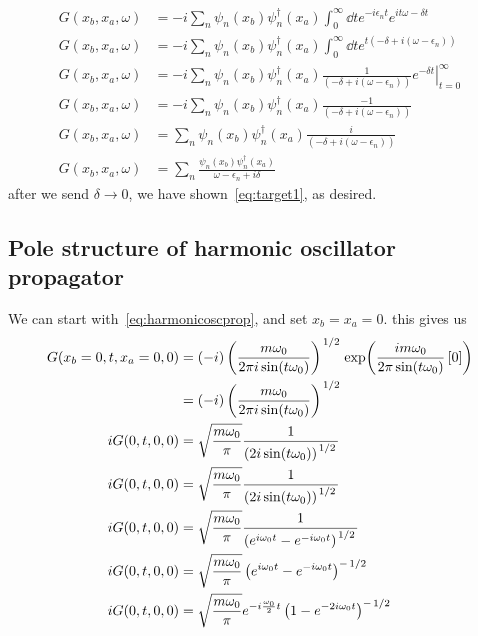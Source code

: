 \documentclass{article}
\begin{document}
	\triv
	\begin{align}
		G(x_b, x_a, \omega) &= -i \sum_{n} \psi_n(x_b) \psi_n^\dagger(x_a)  \int_0^\infty \dd{t} e^{-i \epsilon_{n} t } e^{i t \omega - \delta t} \\
		G(x_b, x_a, \omega) &= -i \sum_{n} \psi_n(x_b) \psi_n^\dagger(x_a)  \int_0^\infty \dd{t} e^{t (-\delta + i(\omega - \epsilon_n))} \\
		G(x_b, x_a, \omega) &= -i \sum_{n} \psi_n(x_b) \psi_n^\dagger(x_a)  \frac{1}{(-\delta + i(\omega - \epsilon_n))} \left. e^{-\delta t} \right|_{t =0}^{\infty} \\
		G(x_b, x_a, \omega) &= -i \sum_{n} \psi_n(x_b) \psi_n^\dagger(x_a)  \frac{-1}{(-\delta + i(\omega - \epsilon_n))} \\
		G(x_b, x_a, \omega) &= \sum_{n} \psi_n(x_b) \psi_n^\dagger(x_a)  \frac{i}{(-\delta + i(\omega - \epsilon_n))} \\
		G(x_b, x_a, \omega) &= \sum_{n} \frac{\psi_n(x_b) \psi_n^\dagger(x_a)}{\omega - \epsilon_n + i \delta}
	\end{align}
	\thrf after we send $\delta \rightarrow 0$, we have shown~\eqref{eq:target1}, as desired.

	\subsection{Pole structure of harmonic oscillator propagator} \label{subsec:sol2}
	We can start with~\eqref{eq:harmonicoscprop}, and set $x_b = x_a = 0$.
	\triv this gives us
	\begin{align}
		G(x_b = 0, t, x_a = 0, 0) &= (-i) \left( \frac{m \omega_0}{2 \pi i \sin(t \omega_0)} \right)^{\flatfrac12} \exp(\frac{i m \omega_0}{2 \pi \sin(t\omega_0)}\left[0\right]) \\
		&= (-i) \left( \frac{m \omega_0}{2 \pi i \sin(t \omega_0)} \right)^{\flatfrac12} \\
		iG(0, t, 0, 0) &= \sqrt{\frac{m \omega_0}{\pi}} \frac{1}{\left(2  i \sin(t \omega_0) \right)^{\flatfrac12}} \\
		iG(0, t, 0, 0) &= \sqrt{\frac{m \omega_0}{\pi}} \frac{1}{\left(2  i \sin(t \omega_0) \right)^{\flatfrac12}} \\
		iG(0, t, 0, 0) &= \sqrt{\frac{m \omega_0}{\pi}} \frac{1}{\left(e^{i \omega_0 t} - e^{- i \omega_0 t}\right)^{\flatfrac12}} \\
		iG(0, t, 0, 0) &= \sqrt{\frac{m \omega_0}{\pi}} \left(e^{i \omega_0 t} - e^{- i \omega_0 t}\right)^{-\flatfrac12} \\
		iG(0, t, 0, 0) &= \sqrt{\frac{m \omega_0}{\pi}} e^{-i\frac{\omega_0}{2} t}\left(1 - e^{- 2 i \omega_0 t}\right)^{-\flatfrac12} \label{eq:donebesidesseries}
	\end{align}
\end{document}
